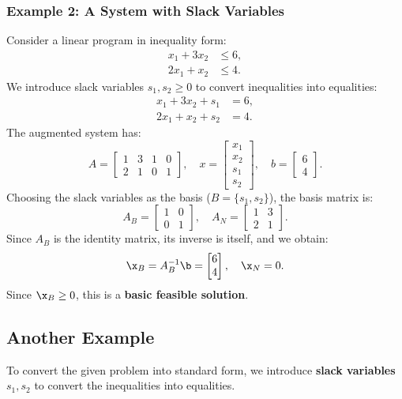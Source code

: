 \subsubsection*{Example 2: A System with Slack Variables}

Consider a linear program in inequality form:
\[
\begin{aligned}
    x_1 + 3x_2 &\leq 6, \\
    2x_1 + x_2 &\leq 4.
\end{aligned}
\]
We introduce slack variables \( s_1, s_2 \geq 0 \) to convert inequalities into equalities:
\[
\begin{aligned}
    x_1 + 3x_2 + s_1 &= 6, \\
    2x_1 + x_2 + s_2 &= 4.
\end{aligned}
\]
The augmented system has:
\[
A =
\begin{bmatrix}
    1 & 3 & 1 & 0 \\
    2 & 1 & 0 & 1
\end{bmatrix}, \quad
x =
\begin{bmatrix}
    x_1 \\ x_2 \\ s_1 \\ s_2
\end{bmatrix}, \quad
b =
\begin{bmatrix}
    6 \\ 4
\end{bmatrix}.
\]
Choosing the slack variables as the basis (\(B= \{s_1, s_2\} \)), the basis matrix is:
\[
A_B =
\begin{bmatrix}
    1 & 0 \\
    0 & 1
\end{bmatrix}, \quad A_N =
\begin{bmatrix}
    1 & 3 \\
    2 & 1
\end{bmatrix}.
\]
Since \( A_B \) is the identity matrix, its inverse is itself, and we obtain:
\[
\x_B = A_B^{-1}\b= 
\begin{bmatrix}
    6 \\ 4
\end{bmatrix}, \quad \x_N = 0.
\]
Since \( \x_B \geq 0 \), this is a \textbf{basic feasible solution}.


\subsection{Another Example}

To convert the given problem into standard form, we introduce \textbf{slack variables} \( s_1, s_2 \) to convert the inequalities into equalities.

